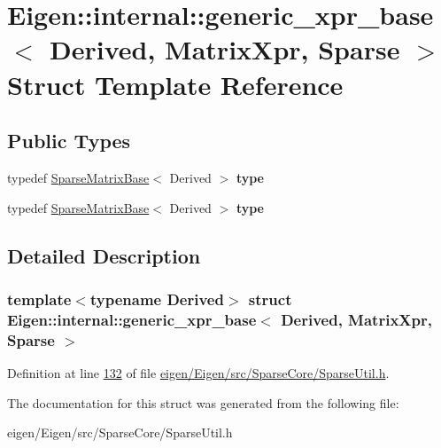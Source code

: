 \hypertarget{struct_eigen_1_1internal_1_1generic__xpr__base_3_01_derived_00_01_matrix_xpr_00_01_sparse_01_4}{}\section{Eigen\+:\+:internal\+:\+:generic\+\_\+xpr\+\_\+base$<$ Derived, Matrix\+Xpr, Sparse $>$ Struct Template Reference}
\label{struct_eigen_1_1internal_1_1generic__xpr__base_3_01_derived_00_01_matrix_xpr_00_01_sparse_01_4}
\subsection*{Public Types}
\begin{DoxyCompactItemize}
\item 
\mbox{\label{struct_eigen_1_1internal_1_1generic__xpr__base_3_01_derived_00_01_matrix_xpr_00_01_sparse_01_4_ac470fe1f432775711644edc7fd42d6e2}} 
typedef \hyperlink{group___sparse_core___module_class_eigen_1_1_sparse_matrix_base}{Sparse\+Matrix\+Base}$<$ Derived $>$ {\bfseries type}
\item 
\mbox{\label{struct_eigen_1_1internal_1_1generic__xpr__base_3_01_derived_00_01_matrix_xpr_00_01_sparse_01_4_ac470fe1f432775711644edc7fd42d6e2}} 
typedef \hyperlink{group___sparse_core___module_class_eigen_1_1_sparse_matrix_base}{Sparse\+Matrix\+Base}$<$ Derived $>$ {\bfseries type}
\end{DoxyCompactItemize}


\subsection{Detailed Description}
\subsubsection*{template$<$typename Derived$>$\newline
struct Eigen\+::internal\+::generic\+\_\+xpr\+\_\+base$<$ Derived, Matrix\+Xpr, Sparse $>$}



Definition at line \hyperlink{eigen_2_eigen_2src_2_sparse_core_2_sparse_util_8h_source_l00132}{132} of file \hyperlink{eigen_2_eigen_2src_2_sparse_core_2_sparse_util_8h_source}{eigen/\+Eigen/src/\+Sparse\+Core/\+Sparse\+Util.\+h}.



The documentation for this struct was generated from the following file\+:\begin{DoxyCompactItemize}
\item 
eigen/\+Eigen/src/\+Sparse\+Core/\+Sparse\+Util.\+h\end{DoxyCompactItemize}
